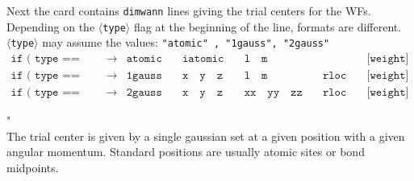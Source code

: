 \noindent Next the card contains {\tt dimwann} lines giving the trial centers for the WFs.
Depending on the $\langle${\tt type}$\rangle$ flag at the beginning of the line,
formats are different.\\

\noindent $\langle${\tt type}$\rangle$ may assume the values: {\tt "atomic" , "1gauss", "2gauss" }\\
%
%
\begin{displaymath}
\begin{array}{lllllll}
\texttt{if ( type == "atomic" )}  & \rightarrow
& \texttt{atomic}
&\quad \texttt{iatomic}
&\quad \texttt{l} \quad  \texttt{m}
&\quad \texttt{ }
&\quad \texttt{[weight]}\\
\texttt{if ( type == "1gauss" )}  & \rightarrow
& \texttt{1gauss}
&\quad \texttt{x} \quad  \texttt{y} \quad  \texttt{z}
&\quad \texttt{l} \quad  \texttt{m}
&\quad \texttt{rloc}
&\quad \texttt{[weight]} \\
\texttt{if ( type == "2gauss" )}  & \rightarrow
& \texttt{2gauss}
&\quad \texttt{x} \quad  \texttt{y} \quad  \texttt{z}
&\quad \texttt{xx} \quad  \texttt{yy} \quad  \texttt{zz}
&\quad \texttt{rloc}
&\quad \texttt{[weight]}
\end{array}
\end{displaymath}
%
%
\bigskip

"\\
\noindent The trial center is given by a single gaussian set at a given position with a given
angular momentum. Standard positions are usually atomic sites or bond midpoints.\\

